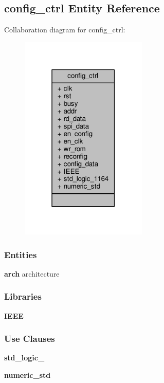 \subsection{config\+\_\+ctrl Entity Reference}
\label{classconfig__ctrl}


Collaboration diagram for config\+\_\+ctrl\+:\nopagebreak
\begin{figure}[H]
\begin{center}
\leavevmode
\includegraphics[width=171pt]{d2/dfe/classconfig__ctrl__coll__graph}
\end{center}
\end{figure}
\subsubsection*{Entities}
\begin{DoxyCompactItemize}
\item 
{\bf arch} architecture
\end{DoxyCompactItemize}
\subsubsection*{Libraries}
 \begin{DoxyCompactItemize}
\item 
{\bf I\+E\+EE} 
\end{DoxyCompactItemize}
\subsubsection*{Use Clauses}
 \begin{DoxyCompactItemize}
\item 
{\bf std\+\_\+logic\+\_}   
\item 
{\bf numeric\+\_\+std}   
\end{DoxyCompactItemize}
